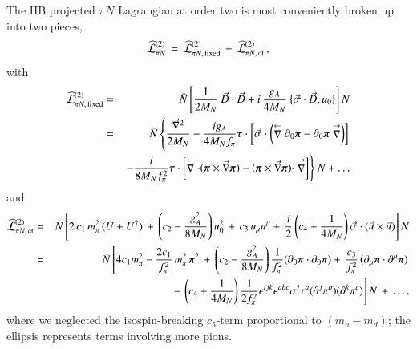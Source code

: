 \documentclass[sort&compress,preprint,3p]{elsarticle}
\begin{document}
The HB projected $\pi N$ Lagrangian at order two 
is most conveniently broken up into two pieces,
\begin{equation}
\widehat{\cal L}^{(2)}_{\pi N} \, = \,
\widehat{\cal L}^{(2)}_{\pi N, \, \rm fixed} \, + \,
\widehat{\cal L}^{(2)}_{\pi N, \, \rm ct} \, ,
\label{eq_L2}
\end{equation}
with
\begin{eqnarray}
\widehat{\cal L}^{(2)}_{\pi N, \, \rm fixed}  
 & = &  
 \bar{N} \left[
\frac{1}{2M_N}\: \vec D \cdot \vec D
+ i\, \frac{g_A}{4M_N}\: \{\vec \sigma \cdot \vec D, u_0\}
 \right] N
\nonumber \\ & = & 
 \bar{N} \left\{
 \frac{{\vec \nabla}^2}{2M_N} 
-\frac{ig_A}{4M_Nf_\pi} 
\mbox{\boldmath $\tau$} \cdot 
\left[
\vec \sigma \cdot
\left( \stackrel{\leftarrow}{\nabla} 
\partial_0 \mbox{\boldmath $\pi$}
 -
\partial_0 \mbox{\boldmath $\pi$}
\stackrel{\rightarrow}{\nabla} \right)
\right]
\right.
\nonumber \\ &&
\left.
- \frac{i}{8M_N f_\pi^2}
\mbox{\boldmath $\tau$} \cdot 
\left[
\stackrel{\leftarrow}{\nabla} 
\cdot
( \mbox{\boldmath $\pi$} \times \vec\nabla \mbox{\boldmath $\pi$} )
   -   
( \mbox{\boldmath $\pi$} \times \vec\nabla \mbox{\boldmath $\pi$} )
\cdot
\stackrel{\rightarrow}{\nabla} 
\right]
\right\} N 
 + \ldots
\label{eq_L2fixed}
\end{eqnarray}
and
\begin{eqnarray}
\widehat{\cal L}^{(2)}_{\pi N, \, \rm ct}
& = & 
 \bar{N} \left[
 2\, c_1
\, m_\pi^2\, (U+U^\dagger)
\, + \, 
\left( c_2 - \frac{g_A^2}{8M_N}\right) u_0^2
 \, + \,
c_3
\, u_\mu  u^\mu
+ \, \frac{i}{2} 
\left( c_4 + \frac{1}{4M_N} \right) 
  \vec \sigma \cdot ( \vec u \times \vec u)
 \right] N 
\nonumber \\ & = & 
 \bar{N} \left[
 4c_1m_\pi^2
-\frac{2 c_1}{f_\pi^2} \, m_\pi^2\, \mbox{\boldmath $\pi$}^2 
\, + \, 
\left( c_2 - \frac{g_A^2}{8M_N}\right) 
\frac{1}{f_\pi^2}
(\partial_0 \mbox{\boldmath{$\pi$}} \cdot 
 \partial_0 \mbox{\boldmath{$\pi$}})
 + \, \frac{c_3}{f_\pi^2}\,
(\partial_\mu \mbox{\boldmath{$\pi$}} \cdot 
\partial^\mu \mbox{\boldmath{$\pi$}})
\right.  
\nonumber \\ && \left.
 - \, \left( c_4 + \frac{1}{4M_N} \right) 
\frac{1}{2f_\pi^2}
\epsilon^{ijk} \epsilon^{abc} \sigma^i \tau^a
(\partial^j \pi^b) (\partial^k \pi^c)
 \right] N 
\, + \, \ldots ,
\label{eq_L2ct}
\end{eqnarray}
where we neglected the isospin-breaking $c_5$-term
proportional to $(m_u-m_d)$;
the ellipsis represents terms involving 
more pions.
\end{document}
